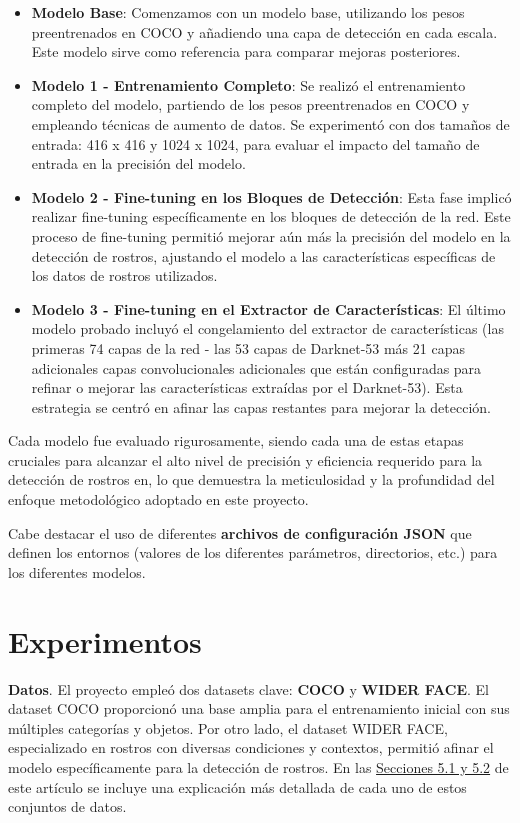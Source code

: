 \documentclass[10pt,twocolumn,letterpaper]{article}
\begin{document}
\begin{itemize}
    \item \textbf{Modelo Base}: Comenzamos con un modelo base, utilizando los pesos preentrenados en COCO y añadiendo una capa de detección en cada escala. Este modelo sirve como referencia para comparar mejoras posteriores.
    \item \textbf{Modelo 1 - Entrenamiento Completo}: Se realizó el entrenamiento completo del modelo, partiendo de los pesos preentrenados en COCO y empleando técnicas de aumento de datos. Se experimentó con dos tamaños de entrada: 416 x 416 y 1024 x 1024, para evaluar el impacto del tamaño de entrada en la precisión del modelo.
    \item \textbf{Modelo 2 - Fine-tuning en los Bloques de Detección}: Esta fase implicó realizar fine-tuning específicamente en los bloques de detección de la red. Este proceso de fine-tuning permitió mejorar aún más la precisión del modelo en la detección de rostros,
											       ajustando el modelo a las características específicas de los datos de rostros utilizados.
    \item \textbf{Modelo 3 - Fine-tuning en el Extractor de Características}: El último modelo probado incluyó el congelamiento del extractor de características (las primeras 74 capas de la red - las 53 capas de Darknet-53 más 21 capas adicionales capas convolucionales adicionales que están configuradas para refinar o mejorar las características extraídas por el Darknet-53). Esta estrategia se centró en afinar las capas restantes para mejorar la detección.
\end{itemize}

Cada modelo fue evaluado rigurosamente, siendo cada una de estas etapas cruciales para alcanzar el alto nivel de precisión y eficiencia requerido para la detección de rostros en, lo que demuestra la meticulosidad y la profundidad del enfoque metodológico adoptado en este proyecto.

Cabe destacar el uso de diferentes \textbf{archivos de configuración JSON} que definen los entornos (valores de los diferentes parámetros, directorios, etc.) para los diferentes modelos.

\section{Experimentos}

\textbf{Datos}. El proyecto empleó dos datasets clave: \textbf{COCO} y \textbf{WIDER FACE}. El dataset COCO proporcionó una base amplia para el entrenamiento inicial con sus múltiples categorías y objetos. Por otro lado, el dataset WIDER FACE, especializado en rostros con diversas condiciones y contextos, permitió afinar el modelo específicamente para la detección de rostros. En las \hyperref[subsec:datasets]{Secciones 5.1 y 5.2} de este artículo se incluye una explicación más detallada de cada uno de estos conjuntos de datos. \\
\end{document}
